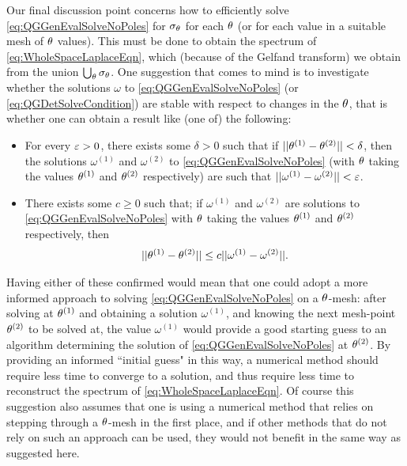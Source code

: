 Our final discussion point concerns how to efficiently solve \eqref{eq:QGGenEvalSolveNoPoles} for $\sigma_\theta$ for each $\theta$ (or for each value in a suitable mesh of $\theta$ values).
This must be done to obtain the spectrum of \eqref{eq:WholeSpaceLaplaceEqn}, which (because of the Gelfand transform) we obtain from the union $\bigcup_{\theta}\sigma_\theta$.
One suggestion that comes to mind is to investigate whether the solutions $\omega$ to \eqref{eq:QGGenEvalSolveNoPoles} (or \eqref{eq:QGDetSolveCondition}) are stable with respect to changes in the $\theta$, that is whether one can obtain a result like (one of) the following:
\begin{itemize}
	\item For every $\varepsilon>0$, there exists some $\delta>0$ such that if $\lvert\lvert \theta^{(1)}-\theta^{(2)} \rvert\rvert<\delta$, then the solutions $\omega^{(1)}$ and $\omega^{(2)}$ to \eqref{eq:QGGenEvalSolveNoPoles} (with $\theta$ taking the values $\theta^{(1)}$ and $\theta^{(2)}$ respectively) are such that $\lvert\lvert \omega^{(1)}-\omega^{(2)} \rvert\rvert<\varepsilon$.
	\item There exists some $c\geq 0$ such that; if $\omega^{(1)}$ and $\omega^{(2)}$ are solutions to \eqref{eq:QGGenEvalSolveNoPoles} with $\theta$ taking the values $\theta^{(1)}$ and $\theta^{(2)}$ respectively, then
	\begin{align*}
		\lvert\lvert \theta^{(1)}-\theta^{(2)} \rvert\rvert \leq c \lvert\lvert \omega^{(1)}-\omega^{(2)} \rvert\rvert.
	\end{align*}
\end{itemize}
Having either of these confirmed would mean that one could adopt a more informed approach to solving \eqref{eq:QGGenEvalSolveNoPoles} on a $\theta$-mesh: after solving at $\theta^{(1)}$ and obtaining a solution $\omega^{(1)}$, and knowing the next mesh-point $\theta^{(2)}$ to be solved at, the value $\omega^{(1)}$ would provide a good starting guess to an algorithm determining the solution of \eqref{eq:QGGenEvalSolveNoPoles} at $\theta^{(2)}$.
By providing an informed ``initial guess" in this way, a numerical method should require less time to converge to a solution, and thus require less time to reconstruct the spectrum of \eqref{eq:WholeSpaceLaplaceEqn}.
Of course this suggestion also assumes that one is using a numerical method that relies on stepping through a $\theta$-mesh in the first place, and if other methods that do not rely on such an approach can be used, they would not benefit in the same way as suggested here.
